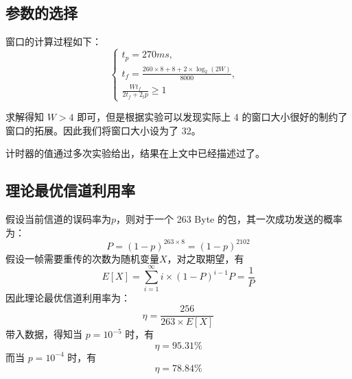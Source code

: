 \documentclass[14pt]{article} %
\begin{document}
\subsection{参数的选择}
窗口的计算过程如下：
\begin{equation}
\left\{
\begin{array}{lr}
t_p = 270ms, &  \\
t_f = \frac {260 \times 8 + 8 + 2\times \log_2 (2W)}{8000}, &\\
\frac{W t_f}{2t_f + 2_tp} \geq 1&  
\end{array}
\right.
\end{equation}

求解得知 $W > 4$ 即可，但是根据实验可以发现实际上 4  的窗口大小很好的制约了窗口的拓展。因此我们将窗口大小设为了 32。

计时器的值通过多次实验给出，结果在上文中已经描述过了。
\subsection{理论最优信道利用率}
假设当前信道的误码率为$p$，则对于一个 263 Byte 的包，其一次成功发送的概率为：
$$P = (1 - p)^{263 \times 8} = (1 - p)^{2102}$$
假设一帧需要重传的次数为随机变量$X$，对之取期望，有
$$E[X] = \sum_{i = 1}^{\infty} i \times (1 - P)^{i - 1}P = \frac{1}{P}$$
因此理论最优信道利用率为：
$$\eta  = \frac{256}{263\times E[X]}$$
带入数据，得知当 $p = 10^{-5}$ 时，有
$$\eta = 95.31\%$$
而当 $p = 10^{-4}$ 时，有
$$\eta = 78.84\%$$
\end{document}
